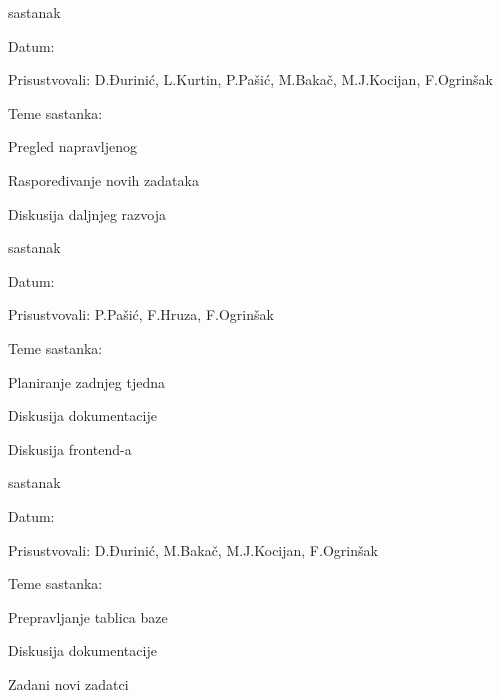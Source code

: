 \begin{packed_enum}
		\item  sastanak
		\item[] \begin{packed_item}
			\item Datum: \desetisastanak
			\item Prisustvovali: D.Đurinić, L.Kurtin, P.Pašić, M.Bakač, M.J.Kocijan, F.Ogrinšak
			\item Teme sastanka:
			\begin{packed_item}
				\item  Pregled napravljenog
				\item	Raspoređivanje novih zadataka
				\item  Diskusija daljnjeg razvoja
			\end{packed_item}
		\end{packed_item}	
	
		\item  sastanak
		\item[] \begin{packed_item}
			\item Datum: \jedanaestisastanak
			\item Prisustvovali: P.Pašić, F.Hruza, F.Ogrinšak
			\item Teme sastanka:
			\begin{packed_item}
				\item  Planiranje zadnjeg tjedna
				\item	Diskusija dokumentacije
				\item  Diskusija frontend-a
			\end{packed_item}
		\end{packed_item}			
			
			\item  sastanak
			\item[] \begin{packed_item}
				\item Datum: \dvanaestisastanak
				\item Prisustvovali: D.Đurinić, M.Bakač, M.J.Kocijan, F.Ogrinšak
				\item Teme sastanka:
				\begin{packed_item}
					\item  Prepravljanje tablica baze
					\item	Diskusija dokumentacije
					\item  Zadani novi zadatci
				\end{packed_item}
			\end{packed_item}	
		

\end{packed_enum}
